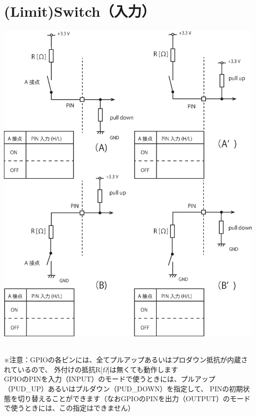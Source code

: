 \documentclass[uplatex,a4paper,11pt,oneside,openany]{jsbook}
\begin{document}
\section{(Limit)Switch（入力）}

\begin{minipage}{0.90\hsize}
      \centering
      \includegraphics[keepaspectratio, scale=0.6, angle=0]
                      {figures/eps/switch00.eps}
                      \label{fig:LED}
\end{minipage}\\

※注意：GPIOの各ピンには、全てプルアップあるいはプロダウン抵抗が内蔵されているので、
外付けの抵抗R[$\Omega$]は無くても動作します\\

GPIOのPINを入力（INPUT）のモードで使うときには、プルアップ（PUD\_UP）あるいはプルダウン（PUD\_DOWN）を指定して、
PINの初期状態を切り替えることができます（なおGPIOのPINを出力（OUTPUT）のモードで使うときには、この指定はできません）

\end{document}
